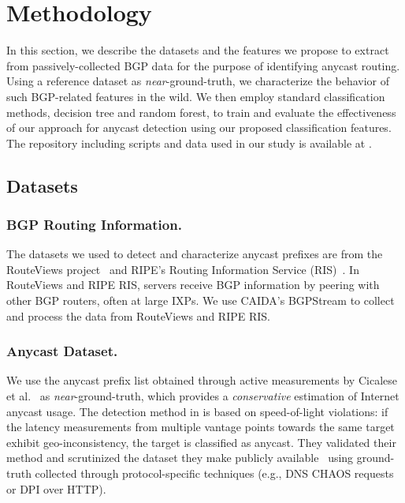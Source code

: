 
\section{Methodology}
\label{sec:meth}
In this section, we describe the datasets and the features we propose to extract from passively-collected BGP data for the purpose of identifying anycast routing. Using a reference dataset as {\it near}-ground-truth, we characterize the behavior of such BGP-related features in the wild. We then employ standard classification methods, decision tree and random forest, to train and evaluate the effectiveness of our approach for anycast detection using our proposed classification features. The repository including scripts and data used in our study is available at \cite{ccr_anycast}.

\subsection{Datasets}
\label{sec:data}
\subsubsection*{BGP Routing Information.} The datasets we used to detect and
characterize anycast prefixes are from the RouteViews project~\cite{Routeviews}
and RIPE's Routing Information Service (RIS)~\cite{RIPE_RIS}. 
In RouteViews and RIPE RIS, servers receive BGP information by peering with other BGP routers, often at large IXPs. We use CAIDA's BGPStream \cite{orsini2016bgpstream} to collect and process the data from RouteViews and RIPE RIS.

\subsubsection*{Anycast Dataset.} 
\label{sec:anycast_ground}
We use the anycast prefix list obtained through active measurements by Cicalese et al.~\cite{cicalese2015characterizing} as {\it near}-ground-truth, which provides a {\it conservative} estimation of Internet anycast usage.
The detection method in \cite{cicalese2015characterizing} is based on speed-of-light violations: if the latency measurements from multiple vantage points towards the same target exhibit geo-inconsistency, the target is  classified as anycast. They validated their method and scrutinized the dataset they make publicly available~\cite{DarioAnycastData} using ground-truth collected through protocol-specific techniques (e.g., DNS CHAOS requests or DPI over HTTP). 

